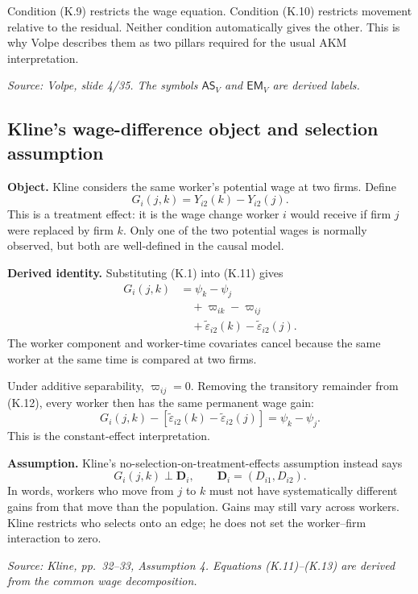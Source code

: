 \documentclass[11pt]{article}
\begin{document}
Condition (K.9) restricts the wage equation.  Condition (K.10) restricts
movement relative to the residual.  Neither condition automatically gives
the other.  This is why Volpe describes them as two pillars required for
the usual AKM interpretation.

\textit{Source: Volpe, slide 4/35.  The symbols
\(\mathsf{AS}_{V}\) and \(\mathsf{EM}_{V}\) are derived labels.}

\subsection{Kline's wage-difference object and selection assumption}

\textbf{Object.}
Kline considers the same worker's potential wage at two firms.  Define
\[
G_i(j,k)
=
Y_{i2}(k)-Y_{i2}(j).
\tag{K.11}
\]
This is a treatment effect: it is the wage change worker \(i\) would receive
if firm \(j\) were replaced by firm \(k\).  Only one of the two potential
wages is normally observed, but both are well-defined in the causal model.

\textbf{Derived identity.}
Substituting (K.1) into (K.11) gives
\[
\begin{aligned}
G_i(j,k)
&=
\psi_k-\psi_j\\
&\quad+
\varpi_{ik}-\varpi_{ij}\\
&\quad+
\widetilde\varepsilon_{i2}(k)
-\widetilde\varepsilon_{i2}(j).
\end{aligned}
\tag{K.12}
\]
The worker component and worker-time covariates cancel because the same
worker at the same time is compared at two firms.

Under additive separability, \(\varpi_{ij}=0\).  Removing the transitory
remainder from (K.12), every worker then has the same permanent wage gain:
\[
G_i(j,k)
-\left[
\widetilde\varepsilon_{i2}(k)
-\widetilde\varepsilon_{i2}(j)
\right]
=
\psi_k-\psi_j.
\tag{K.13}
\]
This is the constant-effect interpretation.

\textbf{Assumption.}
Kline's no-selection-on-treatment-effects assumption instead says
\[
G_i(j,k)\perp\mathbf D_i,
\qquad
\mathbf D_i=(D_{i1},D_{i2}).
\tag{K.14}
\]
In words, workers who move from \(j\) to \(k\) must not have systematically
different gains from that move than the population.  Gains may still vary
across workers.  Kline restricts who selects onto an edge; he does not set
the worker--firm interaction to zero.

\textit{Source: Kline, pp.\ 32--33, Assumption 4.  Equations
(K.11)--(K.13) are derived from the common wage decomposition.}
\end{document}
